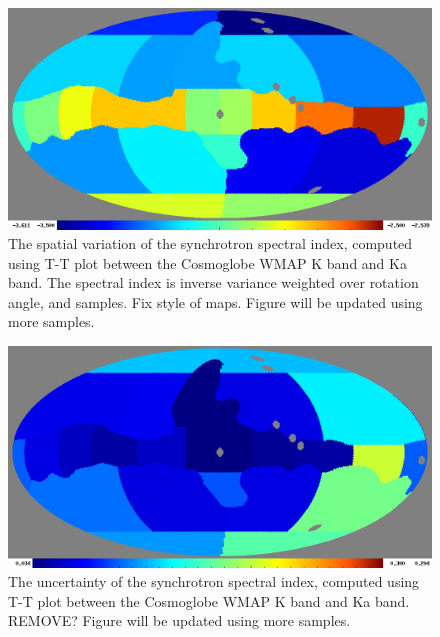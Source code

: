 \documentclass[twocolumn]{../../common/aa}
\newcommand{\red}[0]{\color{red}}
\begin{document}
\begin{figure}
	\centering
	\includegraphics[width=\linewidth]{figures/ut_spectral_index_scatter_alphamean_1.png}
	\caption{The spatial variation of the synchrotron spectral index, computed using T-T plot between the Cosmoglobe WMAP K band and Ka band. The spectral index is inverse variance weighted over rotation angle, and samples. {\red Fix style of maps. Figure will be updated using more samples.}}
        \label{fig:beta_map}
\end{figure}

\begin{figure}
	\centering
	\includegraphics[width=\linewidth]{figures/ut_uncert_scatter_alphamean_1.png}
	\caption{The uncertainty of the synchrotron spectral index, computed using T-T plot between the Cosmoglobe WMAP K band and Ka band. {\red REMOVE? Figure will be updated using more samples.}}
        \label{fig:uncert_map}
\end{figure}
\end{document}
